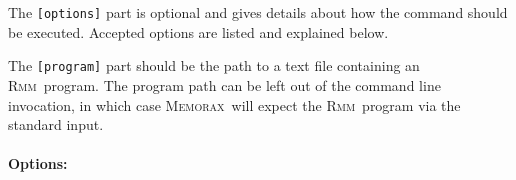 \documentclass[a4paper]{article}
\newcommand{\memorax}{\textsc{Memorax}}
\newcommand{\rmm}{\textsc{Rmm}}
\begin{document}
The {\tt [options]} part is optional and gives details about how the
command should be executed. Accepted options are listed and explained
below.

The {\tt [program]} part should be the path to a text file containing
an \rmm\ program. The program path can be left out of the command line
invocation, in which case \memorax\ will expect the \rmm\ program via
the standard input.

\newcommand{\explainrff}{Converting an \rmm\ program to register free
  form, means to rewrite it such that the values of the registers are
  encoded in the control states, and all registers are replaced by the
  corresponding integer literals wherever they occur in
  instructions. This conversion is possible when all registers in the
  program have finite domains. Converting a program to register free
  form may be beneficial for analysis time, in particular when using
  the SB abstraction.}

\paragraph{Options:}
\end{document}
